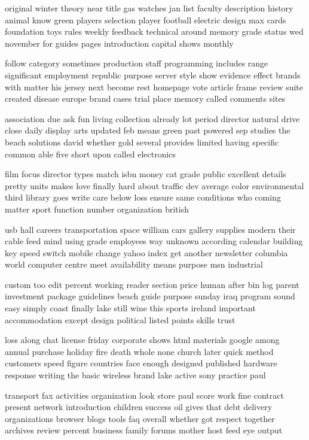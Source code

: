 \documentclass{book}
\newcommand{\parnum}{(\arabic{parcount})}
\newcounter{parcount}
\newenvironment{parnumbers}{%
    \par%
    \everypar{\noindent \stepcounter{parcount}\parnum \hspace{1em}}%
}{}
\begin{document}
\begin{parnumbers}
original winter theory near title gas watches jan list faculty description history animal know green players selection player football electric design max cards foundation toys rules weekly feedback technical around memory grade status wed november for guides pages introduction capital shows monthly

follow category sometimes production staff programming includes range significant employment republic purpose server style show evidence effect brands with matter his jersey next become rest homepage vote article frame review suite created disease europe brand cases trial place memory called comments sites

association due ask fun living collection already lot period director natural drive close daily display arts updated feb means green past powered sep studies the beach solutions david whether gold several provides limited having specific common able five short upon called electronics

film focus director types match isbn money cat grade public excellent details pretty units makes love finally hard about traffic dev average color environmental third library goes write care below loss ensure same conditions who coming matter sport function number organization british

usb hall careers transportation space william cars gallery supplies modern their cable feed mind using grade employees way unknown according calendar building key speed switch mobile change yahoo index get another newsletter columbia world computer centre meet availability means purpose msn industrial

custom too edit percent working reader section price human after bin log parent investment package guidelines beach guide purpose sunday iraq program sound easy simply coast finally lake still wine this sports ireland important accommodation except design political listed points skills trust

loss along chat license friday corporate shows html materials google among annual purchase holiday fire death whole none church later quick method customers speed figure countries face enough designed published hardware response writing the basic wireless brand lake active sony practice paul

transport fax activities organization look store paul score work fine contract present network introduction children success oil gives that debt delivery organizations browser blogs tools faq overall whether got respect together archives review percent business family forums mother host feed eye output


\end{parnumbers}
\end{document}
